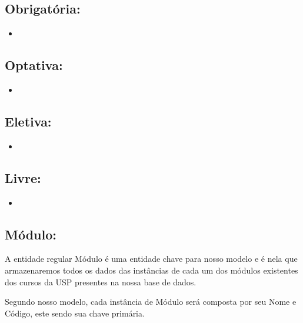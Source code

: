 \documentclass{report}
\begin{document}
\subsection{Obrigatória:} 
\begin{itemize}
  \item 
\end{itemize}
\subsection{Optativa:}  
\begin{itemize}
 \item
\end{itemize}
\subsection{Eletiva:}
\begin{itemize}
  \item
\end{itemize}
\subsection{Livre:}
\begin{itemize}
  \item
\end{itemize}
\fi
\subsection{Módulo:}
A entidade regular Módulo é uma entidade chave para nosso modelo e é nela que armazenaremos todos os dados das instâncias de cada um dos módulos existentes dos cursos da USP presentes na nossa base de dados.
  
  Segundo nosso modelo, cada instância de Módulo será composta por seu Nome e Código, este sendo sua chave primária.
    
\end{document}
